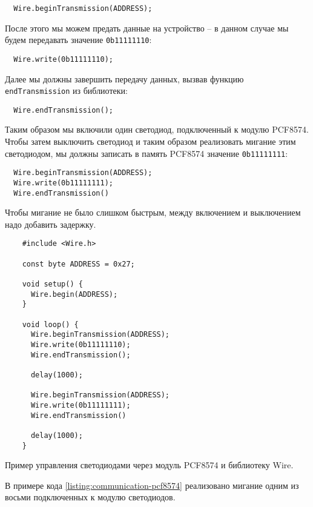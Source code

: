 \documentclass[../sparc.tex]{subfiles}
\begin{document}
\begin{verbatim}
  Wire.beginTransmission(ADDRESS);
\end{verbatim}

После этого мы можем предать данные на устройство -- в данном случае мы будем
передавать значение \texttt{0b11111110}:

\begin{verbatim}
  Wire.write(0b11111110);
\end{verbatim}

Далее мы должны завершить передачу данных, вызвав функцию
\texttt{endTransmission} из библиотеки:

\begin{verbatim}
  Wire.endTransmission();
\end{verbatim}

Таким образом мы включили один светодиод, подключенный к модулю PCF8574.  Чтобы
затем выключить светодиод и таким образом реализовать мигание этим светодиодом,
мы должны записать в память PCF8574 значение \texttt{0b11111111}:

\begin{verbatim}
  Wire.beginTransmission(ADDRESS);
  Wire.write(0b11111111);
  Wire.endTransmission()
\end{verbatim}

Чтобы мигание не было слишком быстрым, между включением и выключением надо
добавить задержку.

\begin{listing}[H]
  \begin{verbatim}
    #include <Wire.h>

    const byte ADDRESS = 0x27;

    void setup() {
      Wire.begin(ADDRESS);
    }

    void loop() {
      Wire.beginTransmission(ADDRESS);
      Wire.write(0b11111110);
      Wire.endTransmission();

      delay(1000);

      Wire.beginTransmission(ADDRESS);
      Wire.write(0b11111111);
      Wire.endTransmission()

      delay(1000);
    }
  \end{verbatim}
  \label{listing:communication-pcf8574}
  \caption{Пример управления светодиодами через модуль PCF8574 и библиотеку
    Wire.}
\end{listing}

В примере кода \ref{listing:communication-pcf8574} реализовано мигание одним из
восьми подключенных к модулю светодиодов.
\end{document}
